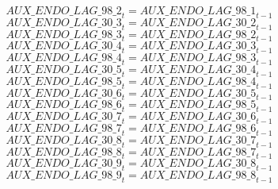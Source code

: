 \begin{dmath}
{AUX\_ENDO\_LAG\_98\_2}_{t}={AUX\_ENDO\_LAG\_98\_1}_{t-1}
\end{dmath}
\begin{dmath}
{AUX\_ENDO\_LAG\_30\_3}_{t}={AUX\_ENDO\_LAG\_30\_2}_{t-1}
\end{dmath}
\begin{dmath}
{AUX\_ENDO\_LAG\_98\_3}_{t}={AUX\_ENDO\_LAG\_98\_2}_{t-1}
\end{dmath}
\begin{dmath}
{AUX\_ENDO\_LAG\_30\_4}_{t}={AUX\_ENDO\_LAG\_30\_3}_{t-1}
\end{dmath}
\begin{dmath}
{AUX\_ENDO\_LAG\_98\_4}_{t}={AUX\_ENDO\_LAG\_98\_3}_{t-1}
\end{dmath}
\begin{dmath}
{AUX\_ENDO\_LAG\_30\_5}_{t}={AUX\_ENDO\_LAG\_30\_4}_{t-1}
\end{dmath}
\begin{dmath}
{AUX\_ENDO\_LAG\_98\_5}_{t}={AUX\_ENDO\_LAG\_98\_4}_{t-1}
\end{dmath}
\begin{dmath}
{AUX\_ENDO\_LAG\_30\_6}_{t}={AUX\_ENDO\_LAG\_30\_5}_{t-1}
\end{dmath}
\begin{dmath}
{AUX\_ENDO\_LAG\_98\_6}_{t}={AUX\_ENDO\_LAG\_98\_5}_{t-1}
\end{dmath}
\begin{dmath}
{AUX\_ENDO\_LAG\_30\_7}_{t}={AUX\_ENDO\_LAG\_30\_6}_{t-1}
\end{dmath}
\begin{dmath}
{AUX\_ENDO\_LAG\_98\_7}_{t}={AUX\_ENDO\_LAG\_98\_6}_{t-1}
\end{dmath}
\begin{dmath}
{AUX\_ENDO\_LAG\_30\_8}_{t}={AUX\_ENDO\_LAG\_30\_7}_{t-1}
\end{dmath}
\begin{dmath}
{AUX\_ENDO\_LAG\_98\_8}_{t}={AUX\_ENDO\_LAG\_98\_7}_{t-1}
\end{dmath}
\begin{dmath}
{AUX\_ENDO\_LAG\_30\_9}_{t}={AUX\_ENDO\_LAG\_30\_8}_{t-1}
\end{dmath}
\begin{dmath}
{AUX\_ENDO\_LAG\_98\_9}_{t}={AUX\_ENDO\_LAG\_98\_8}_{t-1}
\end{dmath}
